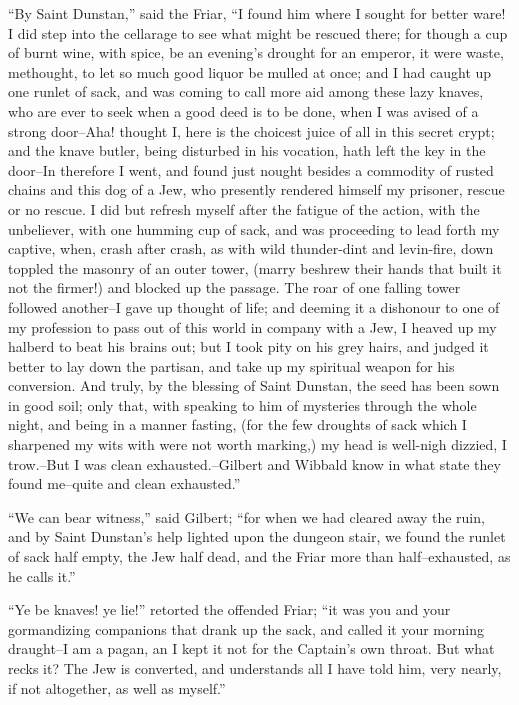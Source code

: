 ``By Saint Dunstan,'' said the Friar, ``I found him where I sought for
better ware! I did step into the cellarage to see what might be rescued
there; for though a cup of burnt wine, with spice, be an evening's
drought for an emperor, it were waste, methought, to let so much good
liquor be mulled at once; and I had caught up one runlet of sack, and
was coming to call more aid among these lazy knaves, who are ever to
seek when a good deed is to be done, when I was avised of a strong
door--Aha! thought I, here is the choicest juice of all in this secret
crypt; and the knave butler, being disturbed in his vocation, hath left
the key in the door--In therefore I went, and found just nought besides
a commodity of rusted chains and this dog of a Jew, who presently
rendered himself my prisoner, rescue or no rescue. I did but refresh
myself after the fatigue of the action, with the unbeliever, with one
humming cup of sack, and was proceeding to lead forth my captive, when,
crash after crash, as with wild thunder-dint and levin-fire, down
toppled the masonry of an outer tower, (marry beshrew their hands that
built it not the firmer!) and blocked up the passage. The roar of one
falling tower followed another--I gave up thought of life; and deeming
it a dishonour to one of my profession to pass out of this world in
company with a Jew, I heaved up my halberd to beat his brains out; but I
took pity on his grey hairs, and judged it better to lay down the
partisan, and take up my spiritual weapon for his conversion. And truly,
by the blessing of Saint Dunstan, the seed has been sown in good soil;
only that, with speaking to him of mysteries through the whole night,
and being in a manner fasting, (for the few droughts of sack which I
sharpened my wits with were not worth marking,) my head is well-nigh
dizzied, I trow.--But I was clean exhausted.--Gilbert and Wibbald know
in what state they found me--quite and clean exhausted.''

``We can bear witness,'' said Gilbert; ``for when we had cleared away
the ruin, and by Saint Dunstan's help lighted upon the dungeon stair, we
found the runlet of sack half empty, the Jew half dead, and the Friar
more than half--exhausted, as he calls it.''

``Ye be knaves! ye lie!'' retorted the offended Friar; ``it was you and
your gormandizing companions that drank up the sack, and called it your
morning draught--I am a pagan, an I kept it not for the Captain's own
throat. But what recks it? The Jew is converted, and understands all I
have told him, very nearly, if not altogether, as well as myself.''

